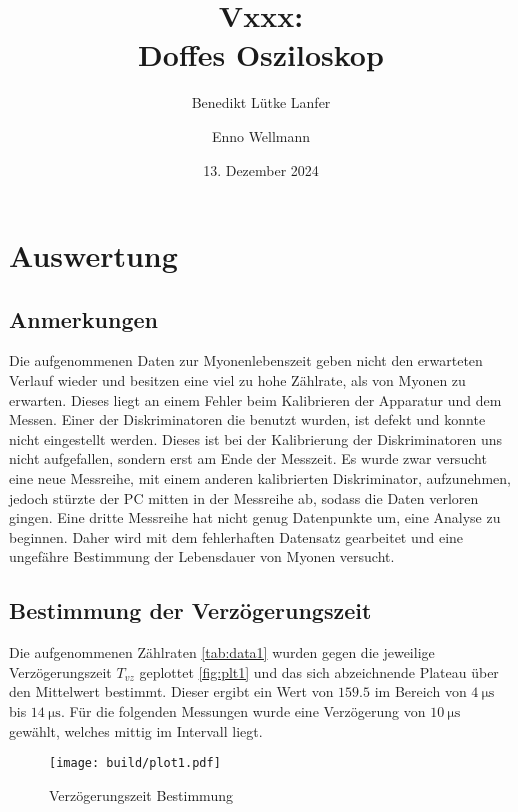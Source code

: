 

\title{Vxxx:\\ Doffes Osziloskop}
\author{Benedikt Lütke Lanfer \and Enno Wellmann}
\date{13. Dezember 2024}
\publishers{TU Dortmund – Fakultät Physik}



\tableofcontents
\newpage



\section{Auswertung}
\subsection{Anmerkungen}
Die aufgenommenen Daten zur Myonenlebenszeit geben nicht den erwarteten Verlauf wieder und besitzen eine viel zu hohe Zählrate, als von Myonen zu erwarten.
Dieses liegt an einem Fehler beim Kalibrieren der Apparatur und dem Messen. 
Einer der Diskriminatoren die benutzt wurden, ist defekt und konnte nicht eingestellt werden. 
Dieses ist bei der Kalibrierung der Diskriminatoren uns nicht aufgefallen, sondern erst am Ende der Messzeit. 
Es wurde zwar versucht eine neue Messreihe, mit einem anderen kalibrierten Diskriminator, aufzunehmen, 
jedoch stürzte der PC mitten in der Messreihe ab, sodass die Daten verloren gingen. 
Eine dritte Messreihe hat nicht genug Datenpunkte um, eine Analyse zu beginnen. 
Daher wird mit dem fehlerhaften Datensatz gearbeitet und eine ungefähre Bestimmung der Lebensdauer von Myonen versucht.    

\subsection{Bestimmung der Verzögerungszeit}
Die aufgenommenen Zählraten \eqref{tab:data1} wurden gegen die jeweilige Verzögerungszeit $T_{vz}$ geplottet \eqref{fig:plt1} 
und das sich abzeichnende Plateau über den Mittelwert bestimmt. Dieser ergibt ein Wert von $\num{159.5}$ im Bereich von $\qty{4}{\us}$ bis $\qty{14}{\us}$.
Für die folgenden Messungen wurde eine Verzögerung von $\qty{10}{\us}$ gewählt, welches mittig im Intervall liegt. 

\begin{figure}[H]
	\centering
	\texttt{[image: build/plot1.pdf]}
	\caption{Verzögerungszeit Bestimmung}\label{fig:plt1}
\end{figure}

